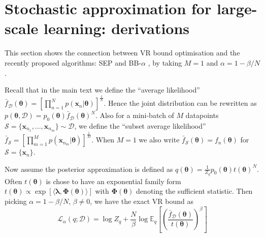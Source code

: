 \section{Stochastic approximation for large-scale learning: derivations}
\label{sec:sub_sampling}

This section shows the connection between VR bound optimisation and the recently proposed algorithms: SEP \cite{li:sep} and BB-$\alpha$ \cite{hernandez-lobato:bb-alpha}, by taking $M = 1$ and $\alpha = 1 - \beta/N$.

Recall that in the main text we define the ``average likelihood'' $\bar{f}_{\mathcal{D}}(\bm{\theta}) = [\prod_{n=1}^N p(\bm{x}_n|\bm{\theta})]^{\frac{1}{N}}$. Hence the joint distribution can be rewritten as $p(\bm{\theta}, \mathcal{D}) = p_0(\bm{\theta}) \bar{f}_{\mathcal{D}}(\bm{\theta})^N$. Also for a mini-batch of $M$ datapoints $\mathcal{S} = \{\bm{x}_{n_1}, ..., \bm{x}_{n_m} \} \sim \mathcal{D}$, we define the ``subset average likelihood'' $\bar{f}_{\mathcal{S}} = [\prod_{m=1}^M p(\bm{x}_{n_m}|\bm{\theta})]^{\frac{1}{M}}$. When $M = 1$ we also write $\bar{f}_{\mathcal{S}}(\bm{\theta}) = f_n(\bm{\theta})$ for $\mathcal{S} = \{ \bm{x}_n \}$.


Now assume the posterior approximation is defined as $q(\bm{\theta}) = \frac{1}{Z_q} p_0(\bm{\theta}) t(\bm{\theta})^N$.
Often $t(\bm{\theta})$ is chose to have an exponential family form $t(\bm{\theta}) \propto \exp \left[ \langle \bm{\lambda}, \bm{\Phi}(\bm{\theta}) \rangle \right]$ with $\bm{\Phi}(\bm{\theta})$ denoting the sufficient statistic. Then picking $\alpha = 1 - \beta/N$, $\beta \neq 0$, we have the exact VR bound as
\begin{equation}
\mathcal{L}_{\alpha}(q; \mathcal{D}) = \log Z_q + \frac{N}{\beta} \log \mathbb{E}_{q} \left[ \left( \frac{ \bar{f}_{\mathcal{D}}(\bm{\theta})} {t(\bm{\theta})} \right)^{\beta} \right]
\label{eq:vr_bound_sa_exact}
\end{equation}

